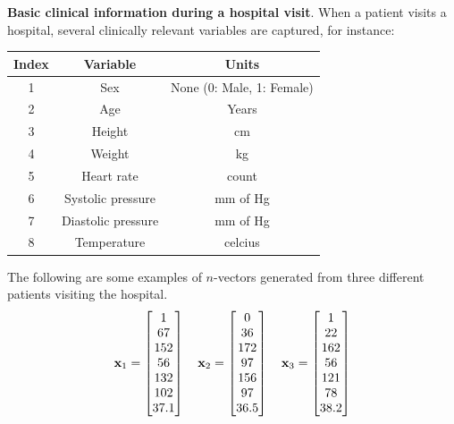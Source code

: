 \begin{boxedstuff}
    \begin{example}
        \textbf{Basic clinical information during a hospital visit}. When a patient visits a hospital, several clinically relevant variables are captured, for instance:
        \begin{small}
            \begin{center}
            \begin{tabular}{ccc}
                \hline
                \textbf{Index} & \textbf{Variable} & \textbf{Units} \\ \hline
                1 & Sex & None (0: Male, 1: Female) \\
                2 & Age & Years \\
                3 & Height & cm \\
                4 & Weight & kg \\
                5 & Heart rate & count \\
                6 & Systolic pressure & mm of Hg \\
                7 & Diastolic pressure & mm of Hg \\
                8 & Temperature & celcius \\ \hline
            \end{tabular}
            \end{center}
        \end{small}
        The following are some examples of $n$-vectors generated from three different patients visiting the hospital.
        \begin{equation*}
            \mf{x}_1 = \bmxc 1 \\ 67 \\ 152 \\ 56 \\ 132 \\ 102 \\ 37.1 \emx \quad \mf{x}_2 = \bmxc 0 \\ 36 \\ 172 \\ 97 \\ 156 \\ 97 \\ 36.5 \emx \quad \mf{x}_3 = \bmxc 1 \\ 22 \\ 162 \\ 56 \\ 121 \\ 78 \\ 38.2 \emx
        \end{equation*}
    \end{example}


\end{boxedstuff}
